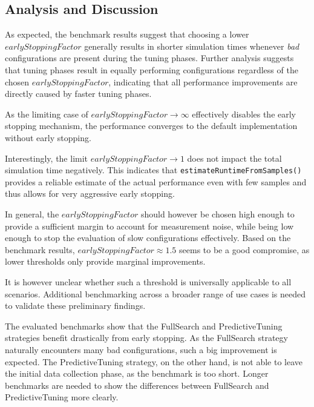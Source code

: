 \documentclass[conference]{IEEEtran}
\begin{document}
\subsection{Analysis and Discussion}
\begin{description}[leftmargin=1.2em, font=\itshape, style=nextline]
    \item[Impact of the Early Stopping Factor:]
        As expected, the benchmark results suggest that choosing a lower $earlyStoppingFactor$ generally results in shorter simulation times whenever \textit{bad} configurations are present during the tuning phases. Further analysis suggests that tuning phases result in equally performing configurations regardless of the chosen $earlyStoppingFactor$, indicating that all
        performance improvements are directly caused by faster tuning phases.

        As the limiting case of $earlyStoppingFactor \rightarrow \infty$ effectively disables the early stopping mechanism, the performance converges to the default implementation without early stopping.

        Interestingly, the limit $earlyStoppingFactor \rightarrow 1$ does not impact the total simulation time negatively. This indicates that \texttt{estimateRuntimeFromSamples()} provides a reliable estimate of the actual performance even with few samples and thus allows for very aggressive early stopping.

        In general, the $earlyStoppingFactor$ should however be chosen high enough to provide a sufficient margin to account for measurement noise, while being low enough to stop the evaluation of slow configurations effectively. Based on the benchmark results, $earlyStoppingFactor \approx 1.5$ seems to be a good compromise, as lower thresholds only provide marginal improvements.

        It is however unclear whether such a threshold is universally applicable to all scenarios. Additional benchmarking across a broader range of use cases is needed to validate these preliminary findings.

    \item[Impact of the Tuning Strategy:]
        The evaluated benchmarks show that the FullSearch and PredictiveTuning strategies benefit drastically from early stopping. As the FullSearch strategy naturally encounters many bad configurations, such a big improvement is expected. The PredictiveTuning strategy, on the other hand, is not able to leave the initial data collection phase, as the benchmark is too short. Longer benchmarks are needed to show the differences between FullSearch and PredictiveTuning more clearly.


\end{description}
\end{document}
